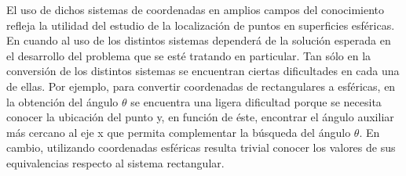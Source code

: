 \hspace{4mm} El uso de dichos sistemas de coordenadas en amplios campos del conocimiento refleja la utilidad del estudio de la localización de puntos en superficies esféricas. En cuando al uso de los distintos sistemas dependerá de la solución esperada en el desarrollo del problema que se esté tratando en particular. Tan sólo en la conversión de los distintos sistemas se encuentran ciertas dificultades en cada una de ellas. Por ejemplo, para convertir coordenadas de rectangulares a esféricas, en la obtención del ángulo ${\theta}$ se encuentra una ligera dificultad porque se necesita conocer la ubicación del punto y, en función de éste, encontrar el ángulo auxiliar más cercano al eje x que permita complementar la búsqueda del ángulo ${\theta}$. En cambio, utilizando coordenadas esféricas resulta trivial conocer los valores de sus equivalencias respecto al sistema rectangular. \cite{ecured}
